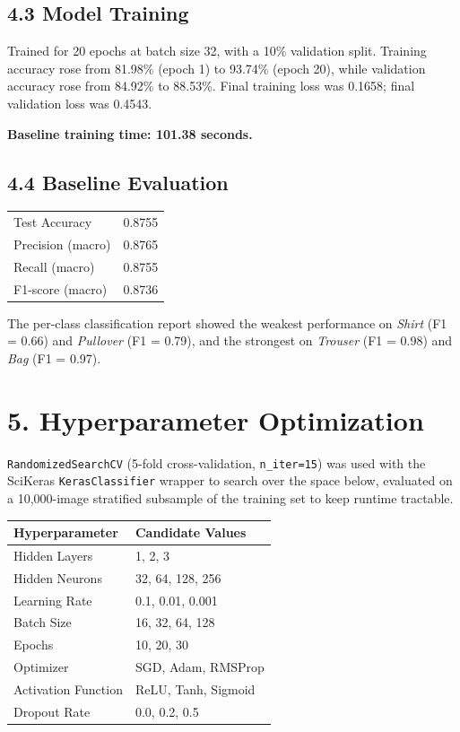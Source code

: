 \documentclass[11pt]{article}
\begin{document}
\subsection*{4.3 Model Training}
Trained for 20 epochs at batch size 32, with a 10\% validation split. Training accuracy rose from 81.98\% (epoch 1) to 93.74\% (epoch 20), while validation accuracy rose from 84.92\% to 88.53\%. Final training loss was 0.1658; final validation loss was 0.4543.

\textbf{Baseline training time: 101.38 seconds.}

\subsection*{4.4 Baseline Evaluation}
\begin{center}
\begin{tabular}{|l|c|}
\hline
Test Accuracy & 0.8755 \\
Precision (macro) & 0.8765 \\
Recall (macro) & 0.8755 \\
F1-score (macro) & 0.8736 \\
\hline
\end{tabular}
\end{center}

The per-class classification report showed the weakest performance on \textit{Shirt} (F1 = 0.66) and \textit{Pullover} (F1 = 0.79), and the strongest on \textit{Trouser} (F1 = 0.98) and \textit{Bag} (F1 = 0.97).

\section*{5. Hyperparameter Optimization}

\texttt{RandomizedSearchCV} (5-fold cross-validation, \texttt{n\_iter=15}) was used with the SciKeras \texttt{KerasClassifier} wrapper to search over the space below, evaluated on a 10,000-image stratified subsample of the training set to keep runtime tractable.

\begin{center}
\begin{tabular}{|p{5cm}|p{7cm}|}
\hline
Hyperparameter & Candidate Values\\
\hline
Hidden Layers & 1, 2, 3\\
Hidden Neurons & 32, 64, 128, 256\\
Learning Rate & 0.1, 0.01, 0.001\\
Batch Size & 16, 32, 64, 128\\
Epochs & 10, 20, 30\\
Optimizer & SGD, Adam, RMSProp\\
Activation Function & ReLU, Tanh, Sigmoid\\
Dropout Rate & 0.0, 0.2, 0.5\\
\hline
\end{tabular}
\end{center}
\end{document}
